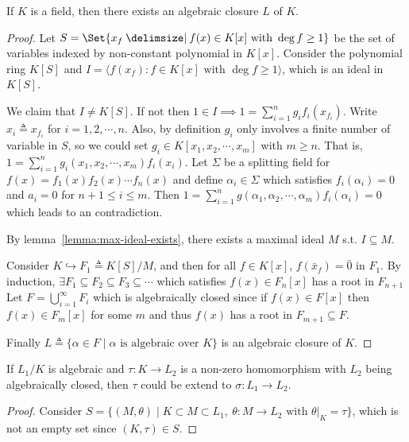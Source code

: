 \begin{theorem}
  If $K$ is a field, then there exists an algebraic closure $L$ of $K$.

  \begin{proof}
    Let $S = \Set{x_f \given f(x) \in K[x] \text{ with } \deg f \geq 1}$ be the set of variables indexed by non-constant
    polynomial in $K[x]$. Consider the polynomial ring $K[S]$ and $I = \langle f(x_f) : f \in K[x] \text{ with } \deg f \geq 1 \rangle$,
    which is an ideal in $K[S]$.

    We claim that $I \neq K[S]$. If not then $1 \in I \implies 1 = \sum_{i = 1}^n g_i f_i(x_{f_i})$.
    Write $x_i \triangleq x_{f_i}$ for $i = 1, 2, \cdots, n$. Also, by definition $g_i$ only involves a finite number of
    variable in $S$, so we could set $g_i \in K[x_1, x_2, \cdots, x_m]$ with $m \geq n$. That is, $1 = \sum_{i = 1}^n g_i(x_1, x_2,
    \cdots, x_m) f_i(x_i)$. Let $\Sigma$ be a splitting field for $f(x) = f_1(x) f_2(x) \cdots f_n(x)$ and define $\alpha_i \in \Sigma$
    which satisfies $f_i(\alpha_i) = 0$ and $a_i = 0$ for $n+1 \leq i \leq m$. Then
    $1 = \sum_{i = 1}^n g(\alpha_1, \alpha_2, \cdots, \alpha_m) f_i(\alpha_i) = 0$ which leads to an contradiction.

    By lemma~\ref{lemma:max-ideal-exists}, there exists a maximal ideal $M$ s.t. $I \subseteq M$.

    Consider $K \hookrightarrow F_1 \triangleq K[S] / M$, and then for all $f \in K[x]$, $f(\bar{x}_f) = \bar{0}$ in $F_1$.
    By induction, $\exists F_1 \subseteq F_2 \subseteq F_3 \subseteq \cdots$
    which satisfies $f(x) \in F_n[x]$ has a root in $F_{n+1}$
    Let $F = \bigcup_{i = 1}^\infty F_i$ which is algebraically closed since if $f(x) \in F[x]$ then $f(x) \in F_m[x]$
    for some $m$ and thus $f(x)$ has a root in $F_{m+1} \subseteq F$.

    Finally $L \triangleq \{ \alpha \in F \mid \alpha \text{ is algebraic over } K \}$ is an algebraic closure of $K$.
  \end{proof}

  \begin{lemma} \label{lemma:homo-extend-to-alg-closed-extension}
    If $L_1 / K$ is algebraic and $\tau: K \to L_2$ is a non-zero homomorphism with $L_2$ being algebraically closed,
    then $\tau$ could be extend to $\sigma: L_1 \to L_2$.

    \begin{proof}
      Consider $S = \{ (M, \theta) \mid K \subset M \subset L_1,\ \theta: M \to L_2 \text{ with } \theta\big|_K = \tau\}$,
      which is not an empty set since $(K, \tau) \in S$.


\end{proof}
\end{lemma}
\end{theorem}
